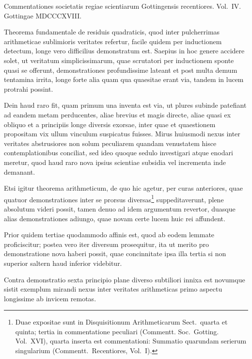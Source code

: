 \documentclass[12pt,a4paper]{article}
\theoremstyle{plain}
\theoremstyle{definition}
\theoremstyle{remark}
\begin{document}
\begin{center}
Commentationes societatis regiae scientiarum Gottingensis recentiores. Vol.~IV.\\
Gottingae MDCCCXVIII.
\end{center}

\vspace{1cm}

Theorema fundamentale de residuis quadraticis, quod inter pulcherrimas arithmeticae sublimioris veritates refertur, facile quidem per inductionem detectum, longe vero difficilius demonstratum est. Saepius in hoc genere accidere solet, ut veritatum simplicissimarum, quae scrutatori per inductionem sponte quasi se offerunt, demonstrationes profundissime lateant et post multa demum tentamina irrita, longe forte alia quam qua quaesitae erant via, tandem in lucem protrahi possint.

Dein haud raro fit, quam primum una inventa est via, ut plures subinde patefiant ad eandem metam perducentes, aliae brevius et magis directe, aliae quasi ex obliquo et a principiis longe diversis exorsae, inter quae et quaestionem propositam vix ullum vinculum suspicatus fuisses. Mirus huiusmodi nexus inter veritates abstrusiores non solum peculiarem quandam venustatem hisce contemplationibus conciliat, sed ideo quoque sedulo investigari atque enodari meretur, quod haud raro nova ipsius scientiae subsidia vel incrementa inde demanant.

Etsi igitur theorema arithmeticum, de quo hic agetur, per curas anteriores, quae quatuor demonstrationes inter se prorsus diversas\footnote{Duae expositae sunt in Disquisitionum Arithmeticarum Sect.~quarta et quinta; tertia in commentatione peculiari (Commentt. Soc.~Gotting. Vol.~XVI), quarta inserta est commentationi: Summatio quarundam serierum singularium (Commentt.~Recentiores, Vol.~I).} suppeditaverunt, plene absolutum videri possit, tamen denuo ad idem argumentum revertor, duasque alias demonstrationes adiungo, quae novam certe lucem huic rei affundent.

Prior quidem tertiae quodammodo affinis est, quod ab eodem lemmate proficiscitur; postea vero iter diversum prosequitur, ita ut merito pro demonstratione nova haberi possit, quae concinnitate ipsa illa tertia si non superior saltern haud inferior videbitur.

Contra demonstratio sexta principio plane diverso subtiliori innixa est novumque sistit exemplum mirandi nexus inter veritates arithmeticas primo aspectu longissime ab invicem remotas.
\end{document}
